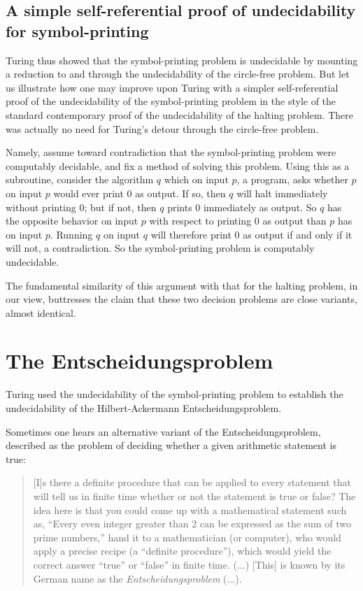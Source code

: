 \documentclass{amsart}
\begin{document}
\subsection{A simple self-referential proof of undecidability for symbol-printing}

Turing thus showed that the symbol-printing problem is undecidable by mounting a reduction to and through the undecidability of the circle-free problem. But let us illustrate how one may improve upon Turing with a simpler self-referential proof of the undecidability of the symbol-printing problem in the style of the standard contemporary proof of the undecidability of the halting problem. There was actually no need for Turing's detour through the circle-free problem. 

Namely, assume toward contradiction that the symbol-printing problem were computably decidable, and fix a method of solving this problem. Using this as a subroutine, consider the algorithm $q$ which on input $p$, a program, asks whether $p$ on input $p$ would ever print $0$ as output. If so, then $q$ will halt immediately without printing $0$; but if not, then $q$ prints $0$ immediately as output. So $q$ has the opposite behavior on input $p$ with respect to printing $0$ as output than $p$ has on input $p$. Running $q$ on input $q$ will therefore print $0$ as output if and only if it will not, a contradiction. So the symbol-printing problem is computably undecidable. 

The fundamental similarity of this argument with that for the halting problem, in our view, buttresses the claim that these two decision problems are close variants, almost identical.

\section{The Entscheidungsproblem}

Turing used the undecidability of the symbol-printing problem to establish the undecidability of the Hilbert-Ackermann \cite{hilbert1931grundzuge} Entscheidungsproblem. 

Sometimes one hears an alternative variant of the Entscheidungsproblem, described as the problem of deciding whether a given arithmetic statement is true:

\begin{quote}\small
    [I]s there a definite procedure that can be applied to every statement that will tell us in finite time whether or not the statement is true or false? The idea here is that you could come up with a mathematical statement such as, \enquote{Every even integer greater than 2 can be expressed as the sum of two prime numbers,} hand it to a mathematician (or computer), who would apply a precise recipe (a \enquote{definite procedure}), which would yield the correct answer \enquote{true} or \enquote{false} in finite time. (...) [This] is known by its German name as the \textit{Entscheidungsproblem} (...). \cite[pp. 58-59]{mitchell2009complexity}
\end{quote} 
\end{document}
